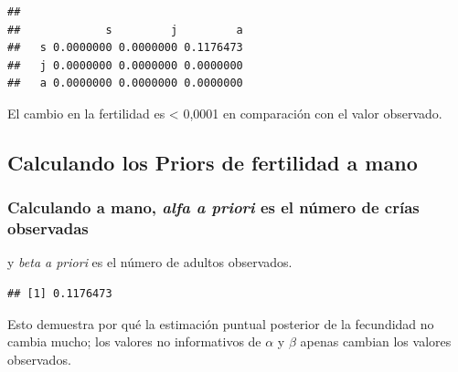 \documentclass[
]{book}
\newenvironment{Shaded}{\begin{snugshade}}{\end{snugshade}}
\newcommand{\CommentTok}[1]{\textcolor[rgb]{0.56,0.35,0.01}{\textit{#1}}}
\newcommand{\DecValTok}[1]{\textcolor[rgb]{0.00,0.00,0.81}{#1}}
\newcommand{\FloatTok}[1]{\textcolor[rgb]{0.00,0.00,0.81}{#1}}
\newcommand{\NormalTok}[1]{#1}
\newcommand{\OtherTok}[1]{\textcolor[rgb]{0.56,0.35,0.01}{#1}}
\newcommand{\SpecialCharTok}[1]{\textcolor[rgb]{0.81,0.36,0.00}{\textbf{#1}}}
\theoremstyle{definition}
\theoremstyle{definition}
\theoremstyle{definition}
\theoremstyle{definition}
\theoremstyle{remark}
\begin{document}
\begin{verbatim}
##    
##             s         j         a
##   s 0.0000000 0.0000000 0.1176473
##   j 0.0000000 0.0000000 0.0000000
##   a 0.0000000 0.0000000 0.0000000
\end{verbatim}

El cambio en la fertilidad es \textless{} 0,0001 en comparación con el valor
observado.

\subsection{Calculando los Priors de fertilidad a mano}\label{calculando-los-priors-de-fertilidad-a-mano}

\subsubsection{\texorpdfstring{Calculando a mano, \emph{alfa a priori} es el número de crías observadas}{Calculando a mano, alfa a priori es el número de crías observadas}}\label{calculando-a-mano-alfa-a-priori-es-el-nuxfamero-de-cruxedas-observadas}

y \emph{beta a priori} es el número de adultos observados.

\begin{Shaded}
\end{Shaded}

\begin{verbatim}
## [1] 0.1176473
\end{verbatim}

Esto demuestra por qué la estimación puntual posterior de la fecundidad
no cambia mucho; los valores no informativos de \(\alpha\) y \(\beta\)
apenas cambian los valores observados.
\end{document}
